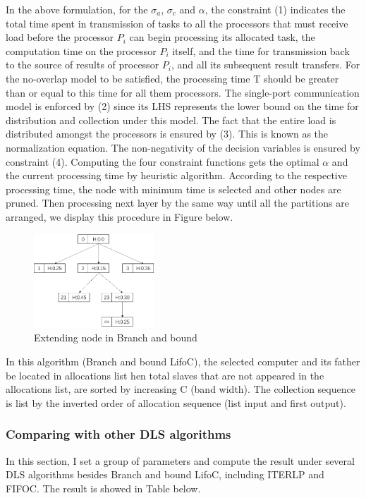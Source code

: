 \documentclass[twocolumn]{article}
\begin{document}
In the above formulation, for the $\sigma_a$, $\sigma_c$ and $\alpha$, the constraint (1) indicates the total time spent in transmission of tasks to all the processors that must receive load before the processor $P_i$ can begin processing its allocated task, the computation time on the processor $P_i$ itself, and the time for transmission back to the source of results of processor $P_i$, and all its subsequent result transfers. For the no-overlap model to be satisfied, the processing time T should be greater than or equal to this time for all them processors. The single-port communication model is enforced by (2) since its LHS represents the lower bound on the time for distribution and collection under this model. The fact that the entire load is distributed amongst the processors is ensured by (3). This is known as the normalization equation. The non-negativity of the decision variables is ensured by constraint (4).
Computing the four constraint functions gets the optimal $\alpha$ and the current processing time by heuristic algorithm. According to the respective processing time, the node with minimum time is selected and other nodes are pruned. Then processing next layer by the same way until all the partitions are arranged, we display this procedure in Figure below.
\begin{figure}[H]
\centering
  \includegraphics[width=0.4\textwidth]{csn2.png}
\caption{Extending node in Branch and bound}
\end{figure}

In this algorithm (Branch and bound LifoC), the selected computer and its father be located in allocations list hen total slaves that are not appeared in the allocations list, are sorted by increasing C (band width). The collection sequence is list by the inverted order of allocation sequence (list input and first output).

\subsubsection{Comparing with other DLS algorithms}
In this section, I set a group of parameters and compute the result under several DLS algorithms besides Branch and bound LifoC, including ITERLP and FIFOC. The result is showed in Table below.
\end{document}
